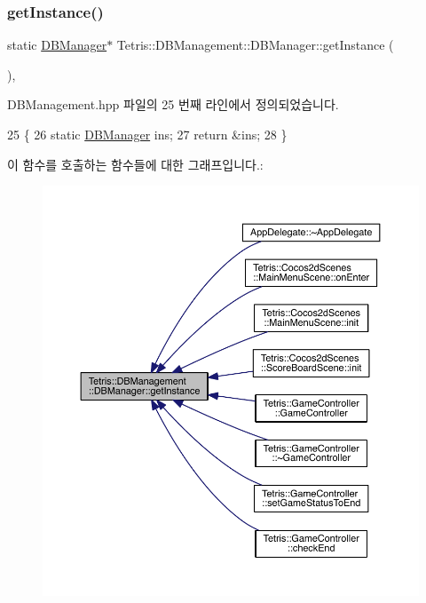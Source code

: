 \subsubsection{\texorpdfstring{get\+Instance()}{getInstance()}}
{\footnotesize\ttfamily static \hyperlink{class_tetris_1_1_d_b_management_1_1_d_b_manager}{D\+B\+Manager}$\ast$ Tetris\+::\+D\+B\+Management\+::\+D\+B\+Manager\+::get\+Instance (\begin{DoxyParamCaption}{ }\end{DoxyParamCaption})\hspace{0.3cm}{\ttfamily [inline]}, {\ttfamily [static]}}



D\+B\+Management.\+hpp 파일의 25 번째 라인에서 정의되었습니다.


\begin{DoxyCode}
25                                            \{
26                 \textcolor{keyword}{static} \hyperlink{class_tetris_1_1_d_b_management_1_1_d_b_manager_a8271c37f255a2e2bc85a3e1896a32c43}{DBManager} ins;
27                 \textcolor{keywordflow}{return} &ins;
28             \}
\end{DoxyCode}
이 함수를 호출하는 함수들에 대한 그래프입니다.\+:
\nopagebreak
\begin{figure}[H]
\begin{center}
\leavevmode
\includegraphics[width=350pt]{da/d79/class_tetris_1_1_d_b_management_1_1_d_b_manager_a9cb81505055490211a9b5c79c3c22c18_icgraph}
\end{center}
\end{figure}
\mbox{\label{class_tetris_1_1_d_b_management_1_1_d_b_manager_aa67ef286408b2631e15e9f8f41937c97}} 
